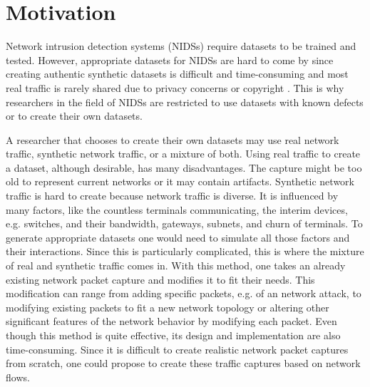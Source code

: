 \documentclass[
	ngerman,
	ruledheaders=section,%
	class=report,%
	thesis={type=bachelor},%
	accentcolor=9c,%
	custommargins=true,%
	marginpar=false,%
	parskip=half-,%
	fontsize=11pt,%
]{tudapub}
\begin{document}
\section{Motivation}

Network intrusion detection systems (NIDSs) require datasets to be trained and tested.
However, appropriate datasets for NIDSs are hard to come by
since creating authentic synthetic datasets is difficult and time-consuming
and most real traffic is rarely shared due to privacy concerns \cite{ringFlowbasedNetworkTraffic2019a} or copyright \cite{corderoID2TDIYDataset2015}.
This is why researchers in the field of NIDSs are restricted to use datasets with known defects or to create their own datasets.

A researcher that chooses to create their own datasets may use real network traffic, synthetic network traffic, or a mixture of both.
Using real traffic to create a dataset, although desirable, has many disadvantages.
The capture might be too old to represent current networks or
it may contain artifacts.
Synthetic network traffic is hard to create because network traffic is diverse.
It is influenced by many factors, like
the countless terminals communicating,
the interim devices, e.g. switches, and their bandwidth,
gateways, subnets, and churn of terminals.
To generate appropriate datasets one would need to simulate all those factors and their interactions.
Since this is particularly complicated,
this is where the mixture of real and synthetic traffic comes in.
With this method, one takes an already existing network packet capture and modifies it to fit their needs.
This modification can range from adding specific packets, e.g. of an network attack\cite{corderoID2TDIYDataset2015},
to modifying existing packets to fit a new network topology
or altering other significant features of the network behavior by modifying each packet.
Even though this method is quite effective, its design and implementation are also time-consuming.
Since it is difficult to create realistic network packet captures from scratch,
one could propose to create these traffic captures based on network flows.
\end{document}
